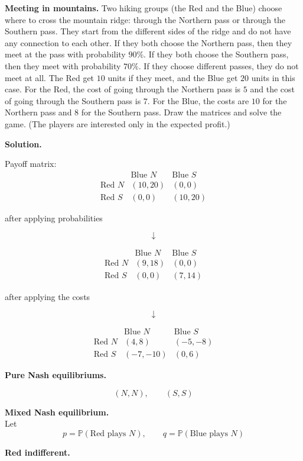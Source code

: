 \textbf{Meeting in mountains.}
Two hiking groups (the Red and the Blue) choose where to cross the mountain ridge:
through the Northern pass or through the Southern pass.
They start from the different sides of the ridge and do not have any connection to each other.
If they both choose the Northern pass, then they meet at the pass with probability \(90\%\).
If they both choose the Southern pass, then they meet with probability \(70\%\).
If they choose different passes, they do not meet at all.
The Red get \(10\) units if they meet, and the Blue get \(20\) units in this case.
For the Red, the cost of going through the Northern pass is \(5\) and the cost of going through the Southern pass is \(7\).
For the Blue, the costs are \(10\) for the Northern pass and \(8\) for the Southern pass.
Draw the matrices and solve the game.
(The players are interested only in the expected profit.)

\textbf{Solution.}

Payoff matrix:
\[
\begin{array}{c|cc}
 & \text{Blue }N & \text{Blue }S\\
\hline
\text{Red }N & (10,20) & (0,0)\\
\text{Red }S & (0,0) & (10,20)
\end{array}
\]

\centerline{after applying probabilities}
\[\downarrow\]

\[
\begin{array}{c|cc}
 & \text{Blue }N & \text{Blue }S\\
\hline
\text{Red }N & (9,18) & (0,0)\\
\text{Red }S & (0,0) & (7,14)
\end{array}
\]

\centerline{after applying the costs}
\[\downarrow\]

\[
\begin{array}{c|cc}
 & \text{Blue }N & \text{Blue }S\\
\hline
\text{Red }N & (4,8) & (-5,-8)\\
\text{Red }S & (-7,-10) & (0,6)
\end{array}
\]

\textbf{Pure Nash equilibriums.}

\[
(N,N), \qquad (S,S)
\]

\textbf{Mixed Nash equilibrium.}\mbox{}\\
\noindent Let
\[
p=\mathbb{P}(\text{Red plays }N), \qquad
q=\mathbb{P}(\text{Blue plays }N)
\]


\textbf{Red indifferent.}

